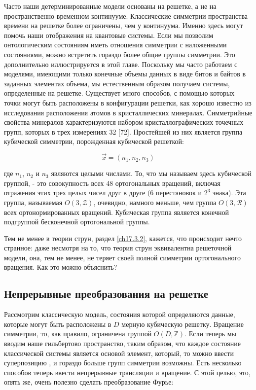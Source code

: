 \documentclass[main.tex]{subfiles}
\begin{document}
Часто наши детерминированные модели основаны на решетке, а не на пространственно-временном континууме. Классические симметрии пространства-времени на решетке более ограничены, чем у континуума. Именно здесь могут помочь наши отображения на квантовые системы. Если мы позволим онтологическим состояниям иметь отношения симметрии с наложенными состояниями, можно встретить гораздо более общие группы симметрии. Это дополнительно иллюстрируется в этой главе.
Поскольку мы часто работаем с моделями, имеющими только конечные объемы данных в виде битов и байтов в заданных элементах объема, мы естественным образом получаем системы, определенные на решетке. Существует много способов, с помощью которых точки могут быть расположены в конфигурации решетки, как хорошо известно из исследования расположения атомов в кристаллических минералах. Симметрийные свойства минералов характеризуются набором кристаллографических точечных групп, которых в трех измерениях 32 [72].
Простейшей из них является группа кубической симметрии, порожденная кубической решеткой:

\begin{equation}\label{18.1}
	\vec x = (n_1, n_2, n_3)
\end{equation}
             

где $n_1$, $n_2$ и $n_3$ являются целыми числами. То, что мы называем здесь кубической группой, - это совокупность всех 48 ортогональных вращений, включая отражения этих трех целых чисел друг в друге (6 перестановок и $2^3$ знака). Эта группа, называемая $O (3, \mathcal Z)$, очевидно, намного меньше, чем группа $O (3, \mathcal R)$ всех ортонормированных вращений. Кубическая группа является конечной подгруппой бесконечной ортогональной группы.

Тем не менее в теории струн, раздел \ref{ch17.3.2}, кажется, что происходит нечто странное: даже несмотря на то, что теория струн эквивалентна решеточной модели, она, тем не менее, не теряет своей полной симметрии ортогонального вращения. Как это можно объяснить?

\subsection{Непрерывные преобразования на решетке}\label{ch18.2}

Рассмотрим классическую модель, состояния которой определяются данные, которые могут быть расположены в $ D $ мерную кубическую решетку. Вращение симметрии, то, как правило, ограничена группой $ O (D, \mathbb {Z}). $ Если теперь мы вводим наше гильбертово пространство, таким образом, что каждое состояние классической системы является основой элемент, который, то можно ввести суперпозицию , и гораздо больше групп симметрии возможны. Есть несколько способов теперь ввести непрерывные трансляции и вращение. С этой целью, это, опять же, очень полезно сделать преобразование Фурье:
\end{document}
